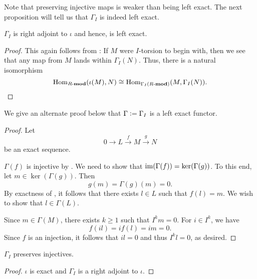 \begin{rem}
	Note that preserving injective maps is weaker than being left exact. The next proposition will tell us that $\Gamma_{I}$ is indeed left exact.
\end{rem}

\begin{prop}
	$\Gamma_{I}$ is right adjoint to $\iota$ and hence, is left exact.
\end{prop}
\begin{proof} 
	This again follows from : If $M$ were $I$-torsion to begin with, then we see that any map from $M$ lands within $\Gamma_{I}(N)$. Thus, there is a natural isomorphism
	\begin{equation*} 
		\operatorname{Hom}_{R\text{-}\mathbf{mod}}(\iota(M), N) \cong \operatorname{Hom}_{\Gamma_{I}(R\text{-}\mathbf{mod})}(M, \Gamma_{I}(N)). \qedhere
	\end{equation*}
\end{proof}
We give an alternate proof below that $\Gamma \vcentcolon= \Gamma_{I}$ is a left exact functor. 
\begin{proof} 
	Let 
	\begin{equation} \label{eq:02}
		0 \to L \xrightarrow{f} M \xrightarrow{g} N
	\end{equation}
	be an exact sequence. 

	$\Gamma(f)$ is injective by . We need to show that $\operatorname{im}(\Gamma(f)) = \ker(\Gamma(g))$. To this end, let $m \in \ker(\Gamma(g))$. Then
	\begin{equation*} 
		g(m) = \Gamma(g)(m) = 0.
	\end{equation*}
	By exactness of , it follows that there exists $l \in L$ such that $f(l) = m$. We wish to show that $l \in \Gamma(L)$. 

	Since $m \in \Gamma(M)$, there exists $k \ge 1$ such that $I^{k} m = 0$. For $i \in I^{k}$, we have
	\begin{equation*} 
		f(il) = if(l) = im = 0.
	\end{equation*}
	Since $f$ is an injection, it follows that $il = 0$ and thus $I^{k}l = 0$, as desired.
\end{proof}

\begin{cor} \label{cor:Gamma-preserves-injectives}
	$\Gamma_{I}$ preserves injectives.
\end{cor}
\begin{proof} 
	$\iota$ is exact and $\Gamma_{I}$ is a right adjoint to $\iota$.
\end{proof}

